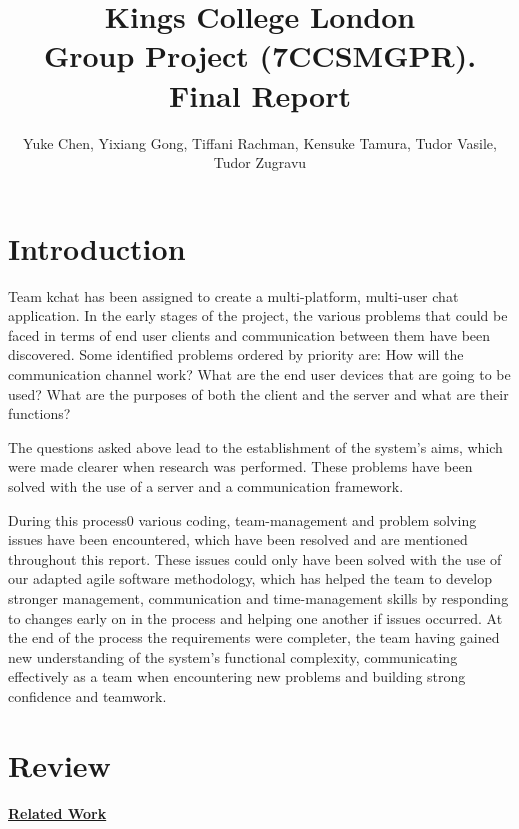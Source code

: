 \documentclass{article}
\author {Yuke Chen, Yixiang Gong, Tiffani Rachman, Kensuke Tamura, Tudor Vasile, Tudor Zugravu}
\title{Kings College London \\ Group Project  (7CCSMGPR).  \\ Final Report}
\begin{document}
	\renewcommand*\contentsname{Contents}
	\maketitle
	\tableofcontents

	\paragraph{}
	\fontsize{12}{12}\selectfont

\newpage
\section{Introduction}

	
	Team kchat has been assigned to create a multi-platform, multi-user chat application. In the early stages of the project, the various problems that could be faced in terms of end user clients and communication between them have been discovered. Some identified problems ordered by priority are: How will the communication channel work? What are the end user devices that are going to be used? What are the purposes of both the client and the server and what are their functions?\par
	The questions asked above lead to the establishment of the system's aims, which were made clearer when research was performed. These problems have been solved with the use of a server and a communication framework.\par
	During this process0 various coding, team-management and problem solving issues have been encountered, which have been resolved and are mentioned throughout this report. These issues could only have been solved with the use of our adapted agile software methodology, which has helped the team to develop stronger management, communication and time-management skills by responding to changes early on in the process and helping one another if issues occurred. At the end of the process the requirements were completer, the team having gained new understanding of the system's functional complexity, communicating effectively as a team when encountering new problems and building strong confidence and teamwork. 
	
	\section{Review}
	
	\textbf{\underline{Related Work}}
	
\end{document}
